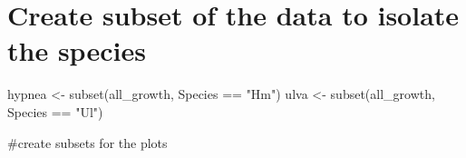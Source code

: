\documentclass[
]{article}
\newenvironment{Shaded}{\begin{snugshade}}{\end{snugshade}}
\newcommand{\FunctionTok}[1]{\textcolor[rgb]{0.00,0.00,0.00}{#1}}
\newcommand{\NormalTok}[1]{#1}
\newcommand{\OtherTok}[1]{\textcolor[rgb]{0.56,0.35,0.01}{#1}}
\newcommand{\SpecialCharTok}[1]{\textcolor[rgb]{0.00,0.00,0.00}{#1}}
\newcommand{\StringTok}[1]{\textcolor[rgb]{0.31,0.60,0.02}{#1}}
\begin{document}
\hypertarget{create-subset-of-the-data-to-isolate-the-species}{%
\section{Create subset of the data to isolate the
species}\label{create-subset-of-the-data-to-isolate-the-species}}

\begin{Shaded}
\begin{Highlighting}[]
\NormalTok{hypnea }\OtherTok{\textless{}{-}} \FunctionTok{subset}\NormalTok{(all\_growth, Species }\SpecialCharTok{==} \StringTok{"Hm"}\NormalTok{)}
\NormalTok{ulva }\OtherTok{\textless{}{-}} \FunctionTok{subset}\NormalTok{(all\_growth, Species }\SpecialCharTok{==} \StringTok{"Ul"}\NormalTok{)}
\end{Highlighting}
\end{Shaded}

\#create subsets for the plots
\end{document}
